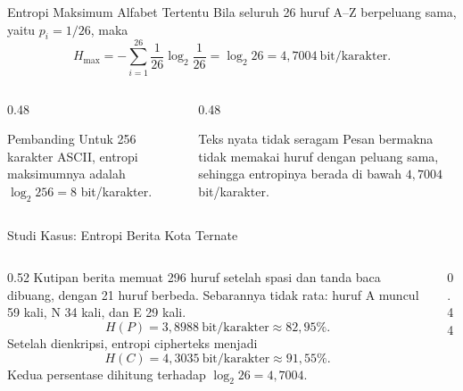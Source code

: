 \documentclass[aspectratio=169,11pt]{beamer}
\begin{document}
\begin{frame}{Entropi Maksimum Alfabet Tertentu}
    Bila seluruh 26 huruf A--Z berpeluang sama, yaitu $p_i = 1/26$, maka
    \[
        H_{\max} = -\sum_{i=1}^{26} \frac{1}{26} \log_2 \frac{1}{26}
                 = \log_2 26 = 4{,}7004\ \text{bit/karakter}.
    \]
    \begin{columns}[T,onlytextwidth]
        \begin{column}{0.48\textwidth}
            \begin{exampleblock}{Pembanding}
                Untuk 256 karakter ASCII, entropi maksimumnya adalah
                $\log_2 256 = 8$ bit/karakter.
            \end{exampleblock}
        \end{column}
        \begin{column}{0.48\textwidth}
            \begin{alertblock}{Teks nyata tidak seragam}
                Pesan bermakna tidak memakai huruf dengan peluang sama,
                sehingga entropinya berada di bawah $4{,}7004$ bit/karakter.
            \end{alertblock}
        \end{column}
    \end{columns}
\end{frame}

\begin{frame}{Studi Kasus: Entropi Berita Kota Ternate}
    \footnotesize
    \begin{columns}[T,onlytextwidth]
        \begin{column}{0.52\textwidth}
            Kutipan berita memuat 296 huruf setelah spasi dan tanda baca
            dibuang, dengan 21 huruf berbeda. Sebarannya tidak rata: huruf A
            muncul 59 kali, N 34 kali, dan E 29 kali.
            \vspace{0.1cm}
            \[ H(P) = 3{,}8988\ \text{bit/karakter} \approx 82{,}95\%. \]
            Setelah dienkripsi, entropi cipherteks menjadi
            \[ H(C) = 4{,}3035\ \text{bit/karakter} \approx 91{,}55\%. \]
            Kedua persentase dihitung terhadap $\log_2 26 = 4{,}7004$.
        \end{column}
        \begin{column}{0.44\textwidth}
            \centering
        \end{column}
    \end{columns}
\end{frame}
\end{document}
